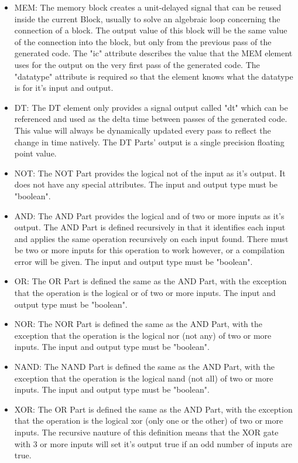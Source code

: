 \begin{itemize}[label={}]
    \item MEM:
The memory block creates a unit-delayed signal that can be reused inside the current Block, usually to solve an algebraic loop concerning the connection of a block.
The output value of this block will be the same value of the connection into the block, but only from the previous pass of the generated code.
The "ic" attribute describes the value that the MEM element uses for the output on the very first pass of the generated code.
The "datatype" attribute is required so that the element knows what the datatype is for it's input and output.
    \item DT:
The DT element only provides a signal output called "dt" which can be referenced and used as the delta time between passes of the generated code.
This value will always be dynamically updated every pass to reflect the change in time natively.
The DT Parts' output is a single precision floating point value.
    \item NOT:
The NOT Part provides the logical not of the input as it's output.
It does not have any special attributes.
The input and output type must be "boolean".
    \item AND:
The AND Part provides the logical and of two or more inputs as it's output.
The AND Part is defined recursively in that it identifies each input and applies the same operation recursively on each input found.
There must be two or more inputs for this operation to work however, or a compilation error will be given.
The input and output type must be "boolean".
    \item OR:
The OR Part is defined the same as the AND Part, with the exception that the operation is the logical or of two or more inputs.
The input and output type must be "boolean".
    \item NOR:
The NOR Part is defined the same as the AND Part, with the exception that the operation is the logical nor (not any) of two or more inputs.
The input and output type must be "boolean".
    \item NAND:
The NAND Part is defined the same as the AND Part, with the exception that the operation is the logical nand (not all) of two or more inputs.
The input and output type must be "boolean".
    \item XOR:
The OR Part is defined the same as the AND Part, with the exception that the operation is the logical xor (only one or the other) of two or more inputs.
The recursive nauture of this definition means that the XOR gate with 3 or more inputs will set it's output true if an odd number of inputs are true.

\end{itemize}
